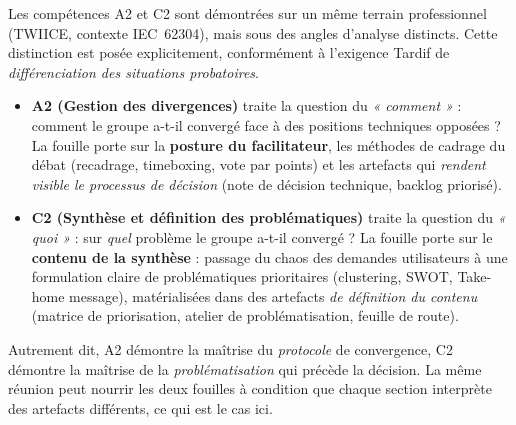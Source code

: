 \bigskip

\begin{tcolorbox}[colback=orange!5, colframe=orange!60!black, boxrule=0.4pt, arc=3pt,
  left=8pt, right=8pt, top=6pt, bottom=6pt,
  title={\textbf{\small Distinction des angles : pourquoi A2 et C2 partagent le terrain TWIICE sans se confondre}},
  fonttitle=\small\bfseries, coltitle=white, attach boxed title to top left={yshift=-2mm, xshift=4mm},
  boxed title style={colback=orange!60!black, arc=3pt, boxrule=0pt}]
\small
Les compétences A2 et C2 sont démontrées sur un même terrain professionnel (TWIICE, contexte IEC~62304), mais sous des angles d'analyse distincts. Cette distinction est posée explicitement, conformément à l'exigence Tardif de \emph{différenciation des situations probatoires}.

\begin{itemize}
  \item \textbf{A2 (Gestion des divergences)} traite la question du \emph{« comment »} : comment le groupe a-t-il convergé face à des positions techniques opposées ? La fouille porte sur la \textbf{posture du facilitateur}, les méthodes de cadrage du débat (recadrage, timeboxing, vote par points) et les artefacts qui \emph{rendent visible le processus de décision} (note de décision technique, backlog priorisé).
  \item \textbf{C2 (Synthèse et définition des problématiques)} traite la question du \emph{« quoi »} : sur \emph{quel} problème le groupe a-t-il convergé ? La fouille porte sur le \textbf{contenu de la synthèse} : passage du chaos des demandes utilisateurs à une formulation claire de problématiques prioritaires (clustering, SWOT, Take-home message), matérialisées dans des artefacts \emph{de définition du contenu} (matrice de priorisation, atelier de problématisation, feuille de route).
\end{itemize}

Autrement dit, A2 démontre la maîtrise du \emph{protocole} de convergence, C2 démontre la maîtrise de la \emph{problématisation} qui précède la décision. La même réunion peut nourrir les deux fouilles à condition que chaque section interprète des artefacts différents, ce qui est le cas ici.
\end{tcolorbox}

\bigskip

